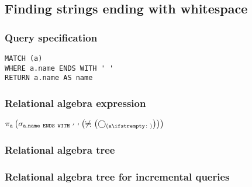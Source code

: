 \subsection{Finding strings ending with whitespace}

\subsubsection*{Query specification}

\begin{lstlisting}
MATCH (a)
WHERE a.name ENDS WITH ' '
RETURN a.name AS name
\end{lstlisting}

\subsubsection*{Relational algebra expression}

$\projection{\var{a}} \left(\selection{\mathtt{a.name~ENDS~WITH~'~'}} \left(\alldifferent{} \left(\getvertices{a}{}\right)\right)\right)$

\subsubsection*{Relational algebra tree}


\subsubsection*{Relational algebra tree for incremental queries}


